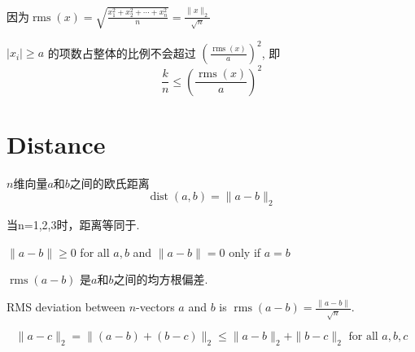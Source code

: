 \begin{corollary}
    因为$ \operatorname{rms}(x)=\sqrt{\frac{x_{1}^{2}+x_{2}^{2}+\cdots+x_{n}^{2}}{n}}=\frac{\|x\|_{2}}{\sqrt{n}} $

    $ \left|x_{i}\right| \geq a $ 的项数占整体的比例不会超过 $ \left(\frac{\operatorname{rms}(x)}{a}\right)^{2} $, 即 $$ \frac{k}{n} \leq\left(\frac{\operatorname{rms}(x)}{a}\right)^{2} $$
\end{corollary}

\section{Distance}

\begin{definition}
    $n$维向量$a$和$b$之间的欧氏距离
    $$ \operatorname{dist}(a, b)=\|a-b\|_{2} $$
\end{definition}

当n=1,2,3时，距离等同于.

\begin{theorem}
    $ \|a-b\| \geq 0 $ for all $ a, b $ and $ \|a-b\|=0 $ only if $ a=b $
\end{theorem}

\begin{definition}
    $ \operatorname{rms}(a-b) $ 是$a$和$b$之间的均方根偏差.
\end{definition}

\begin{corollary}
    RMS deviation between $ n $-vectors $ a $ and $ b $ is $ \operatorname{rms}(a-b)=\frac{\|a-b\|}{\sqrt{n}} $.
\end{corollary}

\begin{theorem}
    $$ \|a-c\|_{2}=\|(a-b)+(b-c)\|_{2} \leq\|a-b\|_{2}+\|b-c\|_{2} \text{ for all } a, b, c $$
\end{theorem}

